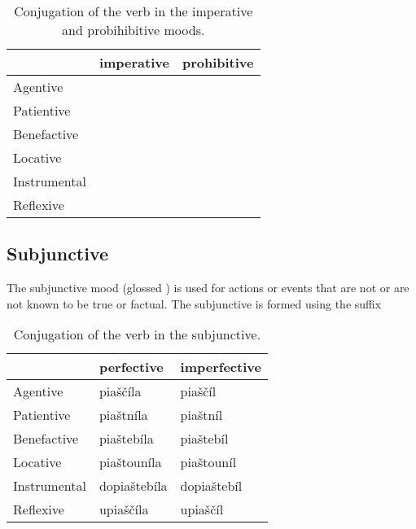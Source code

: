 \begin{table}[h!]
    \footnotesize\sffamily
    \begin{tabu}to 0.6\textwidth{YYY}
         \toprule

         &{\sc imperative}&{\sc prohibitive}  \\
         \midrule
         Agentive &
          &
         \\

         Patientive &
          &
         \\

         Benefactive &
          &
         \\

         Locative &
          &
         \\

         Instrumental &
          &
         \\

         Reflexive &
          &
         \\

         \bottomrule
    \end{tabu}
    \caption{Conjugation of the verb  in the imperative and probihibitive moods.}
    \label{tbl:hortative}
\end{table}

\subsection{Subjunctive}

The subjunctive mood (glossed ) is used for actions or events that are not or are not known to be true or factual. The subjunctive is formed using the suffix 

\begin{table}
	\footnotesize\sffamily
	\caption{Conjugation of the verb  in the subjunctive.}
	\begin{tabu}to 0.7\textwidth{YYY}
		\toprule
		&{\sc perfective} &{\sc imperfective}\\
		\midrule
		Agentive	& pia\v{s}\v{c}\'ila	& pia\v{s}\v{c}\'il\\
		Patientive	& pia\v{s}tn\'ila		& pia\v{s}tn\'il\\
		Benefactive	& pia\v{s}teb\'ila		& pia\v{s}teb\'il\\
		Locative	& pia\v{s}toun\'ila		& pia\v{s}toun\'il\\
		Instrumental& dopia\v{s}teb\'ila	& dopia\v{s}teb\'il\\
		Reflexive	& upia\v{s}\v{c}\'ila	& upia\v{s}\v{c}\'il\\
		\bottomrule
	\end{tabu}
\end{table}

